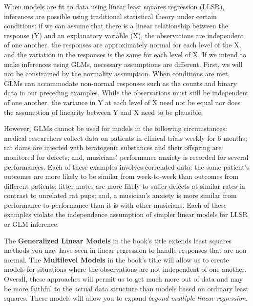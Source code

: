 \documentclass[
]{krantz}
\begin{document}
When models are fit to data using linear least squares regression (LLSR),  inferences are possible using traditional statistical theory under certain conditions: if we can assume that there is a linear relationship between the response (Y) and an explanatory variable (X), the observations are independent of one another, the responses are approximately normal for each level of the X, and the variation in the responses is the same for each level of X. If we intend to make inferences using GLMs, necessary assumptions are different. First, we will not be constrained by the normality assumption. When conditions are met, GLMs can accommodate non-normal responses such as the counts and binary data in our preceding examples. While the observations must still be independent of one another, the variance in Y at each level of X need not be equal nor does the assumption of linearity between Y and X need to be plausible.

However, GLMs cannot be used for models in the following circumstances: medical researchers collect data on patients in clinical trials weekly for 6 months; rat dams are injected with teratogenic substances and their offspring are monitored for defects; and, musicians' performance anxiety is recorded for several performances. Each of these examples involves correlated data: the same patient's outcomes are more likely to be similar from week-to-week than outcomes from different patients; litter mates are more likely to suffer defects at similar rates in contrast to unrelated rat pups; and, a musician's anxiety is more similar from performance to performance than it is with other musicians. Each of these examples violate the independence assumption of simpler linear models for LLSR or GLM inference.

The \textbf{Generalized Linear Models}  in the book's title extends least squares methods you may have seen in linear regression to handle responses that are non-normal. The \textbf{Multilevel Models}  in the book's title will allow us to create models for situations where the observations are not independent of one another. Overall, these approaches will permit us to get much more out of data and may be more faithful to the actual data structure than models based on ordinary least squares. These models will allow you to expand \emph{beyond multiple linear regression}.
\end{document}
